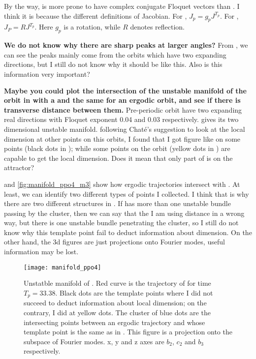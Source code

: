 \begin{description}
By the way,  is more prone to have complex conjugate Floquet vectors
than . I think it is because the different definitions of Jacobian.
For , $J_p = g_p J^{T_p}$. For , $J_P = RJ^{T_p}$.
Here $g_p$ is a rotation, while $R$ denotes reflection.

\textbf{We do not know why there are sharp peaks at larger angles?}
From , we can see the peaks mainly
come from the orbits which have two expanding directions, but I still do not
know
why it should be like this. Also is this information very important?

\textbf{Maybe you could plot the intersection of the unstable manifold
of the orbit in  with a {\PoincSec}
and the same for an ergodic orbit, and see if there is transverse
distance between them.} Pre-periodic orbit  have two
expanding real directions with Floquet exponent 0.04 and 0.03
respectively.  gives its two dimensional
unstable manifold. following Chat\'{e}'s suggestion to look at the
local dimension at other points on this orbits, I found that I got
figure like  on some points (black
dots in ); while some points on the orbit
(yellow dots in ) are capable to get the
local dimension. Does it mean that only part of  is on the
attractor?

 and \ref{fig:manifold_ppo4_m3} show how ergodic
trajectories intersect with {\PoincSec}. At least, we can identify two
different types of points I collected. I think that is why there are
two different structures
in . If  has more than
one unstable bundle passing by the cluster, then we can say that the I am using
distance in a wrong way, but there is one unstable bundle penetrating the cluster,
so I still do not know why this template point fail to deduct information about
dimension. On the other hand, the 3d figures are just projections onto Fourier modes,
useful information may be lost.

\begin{figure}[h]
  \centering
  \texttt{[image: manifold\_ppo4]}
  \caption{Unstatble manifold of . Red curve is the trajectory of
     for time $T_p = 33.38$. Black dots are the template points where I
    did not succeed to deduct information about local dimension; on the contrary,
    I did at yellow dots. The cluster of blue dots are the intersecting points between
    an ergodic trajectory and {\PoincSec} whose template point is the same as
    in . This figure is a projection onto the
    subspace of Fourier modes. x, y and z axes are $b_2$, $c_2$ and $b_3$ respectively.
  }
  \label{fig:manifold_ppo4}
\end{figure}


\end{description}
